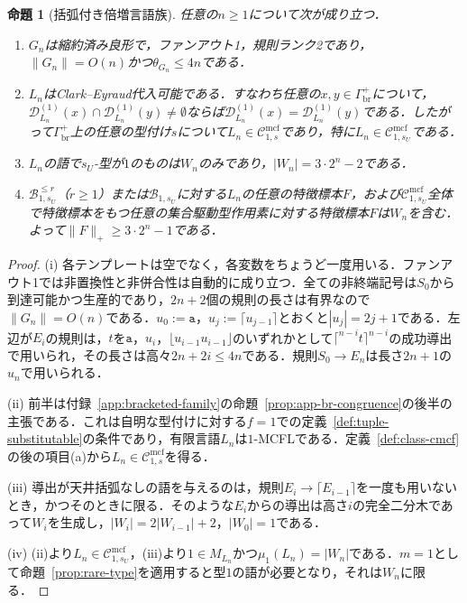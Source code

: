 \documentclass[11pt,a4paper]{ltjsarticle}
\numberwithin{equation}{section}
\theoremstyle{plain}
\newtheorem{proposition}[theorem]{命題}
\theoremstyle{definition}
\theoremstyle{remark}
\newcommand{\Cmcf}[2]{\mathcal{C}^{\mathrm{mcf}}_{#1,#2}}
\newcommand{\D}{\mathcal{D}}
\begin{document}
\begin{proposition}[括弧付き倍増言語族]
\label{prop:bracketed-family}
任意の$n\ge1$について次が成り立つ．
\begin{enumerate}[label=\textup{(\roman*)},leftmargin=*]
\item $G_n$は縮約済み良形で，ファンアウト1，規則ランク2であり，$\|G_n\|=O(n)$かつ$\theta_{G_n}\le4n$である．
\item $L_n$はClark--Eyraud代入可能である．すなわち任意の$x,y\in\Gamma_{\mathrm{br}}^+$について，$\D^{(1)}_{L_n}(x)\cap\D^{(1)}_{L_n}(y)\ne\emptyset$ならば$\D^{(1)}_{L_n}(x)=\D^{(1)}_{L_n}(y)$である．したがって$\Gamma_{\mathrm{br}}^+$上の任意の型付け$s$について$L_n\in\Cmcf{1}{s}$であり，特に$L_n\in\Cmcf{1}{s_U}$である．
\item $L_n$の語で$s_U$-型が$1$のものは$W_n$のみであり，$|W_n|=3\cdot2^n-2$である．
\item $\mathcal B^{\le r}_{1,s_U}$（$r\ge1$）または$\mathcal B_{1,s_U}$に対する$L_n$の任意の特徴標本$F$，および$\Cmcf{1}{s_U}$全体で特徴標本をもつ任意の集合駆動型作用素に対する特徴標本$F$は$W_n$を含む．よって$\|F\|_+\ge3\cdot2^n-1$である．
\end{enumerate}
\end{proposition}

\begin{proof}
(i) 各テンプレートは空でなく，各変数をちょうど一度用いる．ファンアウト1では非置換性と非併合性は自動的に成り立つ．全ての非終端記号は$S_0$から到達可能かつ生産的であり，$2n+2$個の規則の長さは有界なので$\|G_n\|=O(n)$である．$u_0:=\mathtt a$，$u_j:=\lceil u_{j-1}\rceil$とおくと$|u_j|=2j+1$である．左辺が$E_i$の規則は，$t$を$\mathtt a$，$u_i$，$\lfloor u_{i-1}u_{i-1}\rfloor$のいずれかとして$\lceil^{n-i}t\rceil^{n-i}$の成功導出で用いられ，その長さは高々$2n+2i\le4n$である．規則$S_0\to E_n$は長さ$2n+1$の$u_n$で用いられる．

(ii) 前半は付録~\ref{app:bracketed-family}の命題~\ref{prop:app-br-congruence}の後半の主張である．これは自明な型付けに対する$f=1$での定義~\ref{def:tuple-substitutable}の条件であり，有限言語$L_n$は$1$-MCFLである．定義~\ref{def:class-cmcf}の後の項目(a)から$L_n\in\Cmcf{1}{s}$を得る．

(iii) 導出が天井括弧なしの語を与えるのは，規則$E_i\to\lceil E_{i-1}\rceil$を一度も用いないとき，かつそのときに限る．そのような$E_i$からの導出は高さ$i$の完全二分木であって$W_i$を生成し，$|W_i|=2|W_{i-1}|+2$，$|W_0|=1$である．

(iv) (ii)より$L_n\in\Cmcf{1}{s_U}$，(iii)より$1\in M_{L_n}$かつ$\mu_1(L_n)=|W_n|$である．$m=1$として命題~\ref{prop:rare-type}を適用すると型$1$の語が必要となり，それは$W_n$に限る．
\end{proof}
\end{document}
